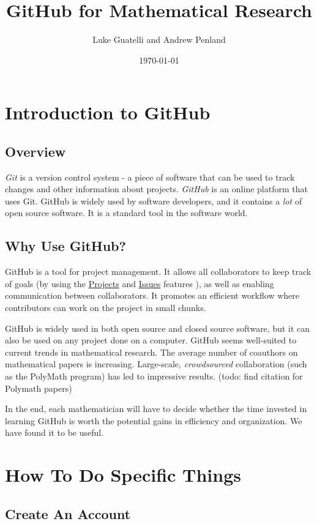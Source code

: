 \documentclass[11pt]{article}
\title{GitHub for Mathematical Research}
\author{Luke Guatelli and Andrew Penland}
\date{\today}
\begin{document}
\maketitle

\section{Introduction to GitHub}

\subsection{Overview}

\textit{Git} is a version control system - a piece of software that can be used to track changes and other information about projects. \textit{GitHub} is an online platform that uses Git. GitHub is widely used by software developers, and it contains a \textit{lot} of open source software. It is a standard tool in the software world. 

\subsection{Why Use GitHub?}

GitHub is a tool for project management. It allows all collaborators to keep track of goals (by using the \hyperlink{proj-section}{Projects} and \hyperlink{issues-section}{Issues} features ), as well as enabling communication between collaborators. It promotes an efficient workflow where contributors can work on the project in small chunks.

GitHub is widely used in both open source and closed source software, but it can also be used on any project done on a computer.  GitHub seems well-suited to current trends in mathematical research. The average number of coauthors on mathematical papers is increasing. Large-scale, \textit{crowdsourced} collaboration (such as the PolyMath program) has led to impressive results. (todo: find citation for Polymath papers) 

In the end, each mathematician will have to decide whether the time invested in learning GitHub is worth the potential gains in efficiency and organization. We have found it to be useful.

\section{How To Do Specific Things}
\newpage
\subsection{Create An Account}
\end{document}
